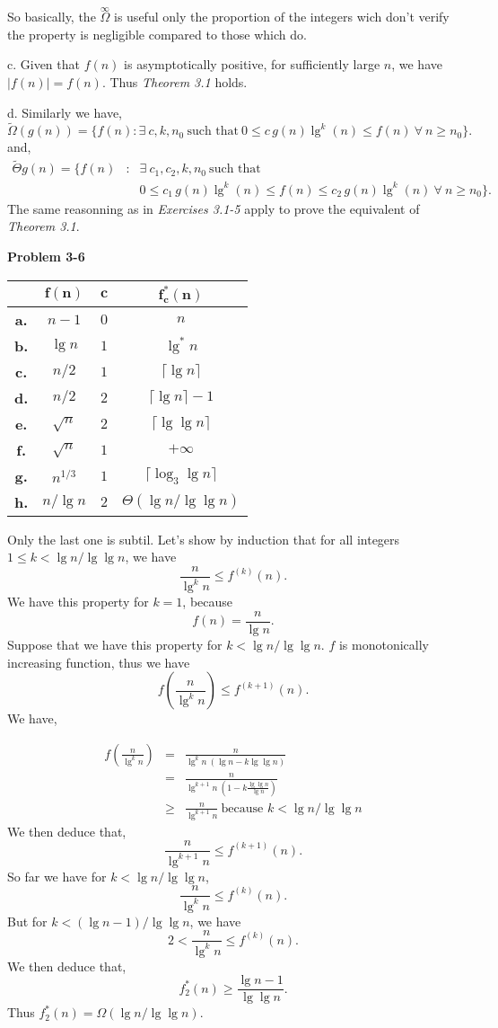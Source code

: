 \documentclass[a4paper,12pt]{article}
\newcommand{\newprob}[1]
{\bigskip \noindent \textbf{Problem #1} \newline}
\newcommand{\subpar}[1]
{\medskip \noindent #1.}
\begin{document}
So basically, the $\stackrel{\infty}{\Omega}$ is useful only the
proportion of the integers wich don't verify the property is
negligible compared to those which do.

\subpar{c}  Given that $f(n)$ is asymptotically positive, for sufficiently
large $n$, we have $|f(n)| = f(n)$.  Thus \emph{Theorem 3.1} holds.

\subpar{d} Similarly we have,
\[ \tilde{\Omega}(g(n)) = \{f(n): \exists\ c, k, n_0\ \mbox{such
  that}\ 0 \le c\,g(n) \lg^k(n) \le f(n)\ \forall\ n \ge n_0\}.\]
and,
\begin{eqnarray*}
\tilde{\Theta}{g(n)} = \{f(n)&:& \exists\ c_1, c_2, k, n_0\ 
\mbox{such that}\\
&& 0 \le c_1\,g(n) \lg^k(n) \le f(n) \le
c_2\,g(n) \lg^k(n)\ \forall\ n \ge n_0\}.
\end{eqnarray*}
The same reasonning as in \emph{Exercises 3.1-5} apply to prove the
equivalent of \emph{Theorem 3.1}.

\newprob{3-6}
\begin{tabular}{|c|c|c|c|}
\hline
&$\mathbf{f(n)}$&$\mathbf{c}$&$\mathbf{f_c^*(n)}$\\
\hline
\textbf{a.}&$n-1$&$0$&$n$\\
\hline
\textbf{b.}&$\lg n$&$1$&$\lg^*n$ \\
\hline
\textbf{c.}&$n/2$&$1$&$\lceil \lg n\rceil$ \\
\hline
\textbf{d.}&$n/2$&$2$&$\lceil \lg n\rceil - 1$ \\
\hline
\textbf{e.}&$\sqrt{n}$&$2$&$\lceil \lg \lg n\rceil$ \\
\hline
\textbf{f.}&$\sqrt{n}$&$1$&$+\infty$ \\
\hline
\textbf{g.}&$n^{1/3}$&$1$&$\lceil \log_3 \lg n\rceil$ \\
\hline
\textbf{h.}&$n/\lg n$&$2$&$\Theta(\lg n / \lg \lg n)$ \\
\hline
\end{tabular}

\medskip
Only the last one is subtil.  Let's show by induction that for all integers
$1\le k < \lg n/\lg \lg n$, we have
\[ \frac{n}{\lg^k n} \le f^{(k)}(n).\]
We have this property for $k=1$, because
\[ f(n) = \frac{n}{\lg n}.\]
Suppose that we have this property for $k < \lg n/\lg \lg n$.  $f$
is monotonically increasing function, thus we have
\[ f\left(\frac{n}{\lg^k n}\right) \le f^{(k+1)}(n).\]
We have,

\begin{eqnarray*}
f\left(\frac{n}{\lg^k n}\right) &=&
\frac{n}{\lg^k n\ (\lg n - k \lg \lg n)} \\
&=&\frac{n}{\lg^{k+1}n\ (1 - k \frac{\lg \lg n}{\lg n})} \\
&\ge& \frac{n}{\lg^{k+1}n}\ \mbox{because $k < \lg n /\lg \lg n$}
\end{eqnarray*}
We then deduce that,
\[ \frac{n}{\lg^{k+1}n} \le f^{(k+1)}(n).\]
So far we have for $k < \lg n / \lg \lg n$,
\[ \frac{n}{\lg^kn} \le f^{(k)}(n).\]
But for $k < (\lg n - 1)/\lg \lg n$, we have
\[ 2 < \frac{n}{\lg^k n} \le f^{(k)}(n).\]
We then deduce that,
\[ f^*_2(n) \ge \frac{\lg n - 1}{\lg \lg n}.\]
Thus $f^*_2(n) = \Omega(\lg n/\lg\lg n)$.
\end{document}
